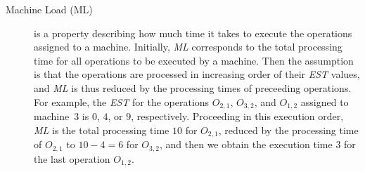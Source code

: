 \documentclass[runningheads]{llncs}
\begin{document}
\begin{description}
  \item[Machine Load (ML)] is a property describing how much time it takes to execute the operations assigned to a machine. Initially, \textit{ML} corresponds to the total processing time for all operations to be executed by a machine.
  Then the assumption is that the operations are processed in increasing order of their \textit{EST} values, and \textit{ML} is thus reduced by the processing times of preceeding operations.
  For example, the \textit{EST} for the operations $O_{2,1}$, $O_{3,2}$, and $O_{1,2}$ assigned to machine~$3$ is $0$, $4$, or $9$, respectively.
  Proceeding in this execution order, \textit{ML} is the total processing time $10$ for $O_{2,1}$, reduced by the processing time of $O_{2,1}$ to $10-4 = 6$ for $O_{3,2}$, and then we obtain the execution time $3$ for the last operation $O_{1,2}$.
  

\end{description}
\end{document}
